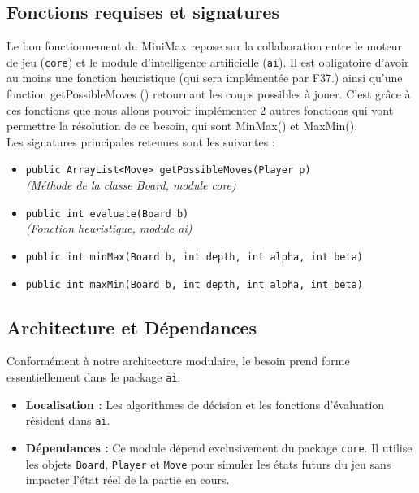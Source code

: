 \documentclass[a4paper]{article}
\begin{document}
\subsection{Fonctions requises et signatures}
Le bon fonctionnement du MiniMax repose sur la collaboration entre le moteur de jeu (\texttt{core}) et le module d'intelligence artificielle (\texttt{ai}). Il est obligatoire d’avoir au moins une fonction heuristique (qui sera implémentée par F37.) ainsi qu’une fonction getPossibleMoves () retournant les coups possibles à jouer. C’est grâce à ces fonctions que nous allons pouvoir implémenter 2 autres fonctions qui vont permettre la résolution de ce besoin, qui sont MinMax() et MaxMin().\\

Les signatures principales retenues sont les suivantes :
\begin{itemize}
    \item \texttt{public ArrayList<Move> getPossibleMoves(Player p)} \\ \textit{(Méthode de la classe Board, module core)}
    \item \texttt{public int evaluate(Board b)} \\ \textit{(Fonction heuristique, module ai)}
    \item \texttt{public int minMax(Board b, int depth, int alpha, int beta)}
    \item \texttt{public int maxMin(Board b, int depth, int alpha, int beta)}
\end{itemize}

\subsection{Architecture et Dépendances}
Conformément à notre architecture modulaire, le besoin prend forme essentiellement dans le package \texttt{ai}.
\begin{itemize}
    \item \textbf{Localisation :} Les algorithmes de décision et les fonctions d'évaluation résident dans \texttt{ai}.
    \item \textbf{Dépendances :} Ce module dépend exclusivement du package \texttt{core}. Il utilise les objets \texttt{Board}, \texttt{Player} et \texttt{Move} pour simuler les états futurs du jeu sans impacter l'état réel de la partie en cours.
\end{itemize}
\end{document}
